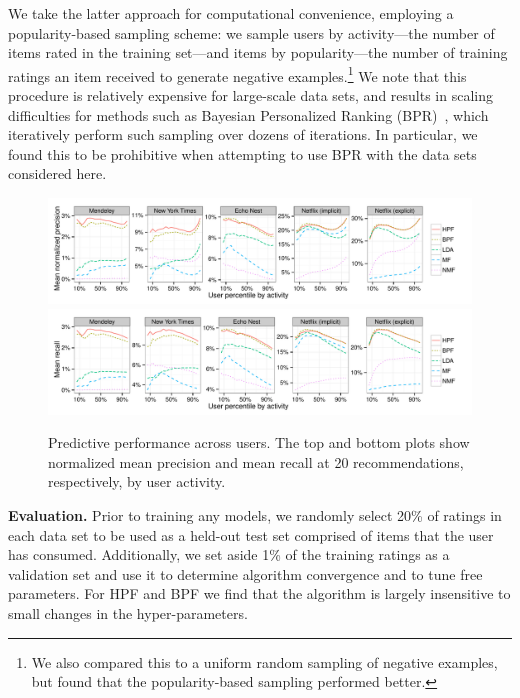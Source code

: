 We take the latter approach for computational convenience, employing a
popularity-based sampling scheme: we sample users by activity---the
number of items rated in the training set---and items by
popularity---the number of training ratings an item received to
generate negative examples.\footnote{We also compared this to a
  uniform random sampling of negative examples, but found that the
  popularity-based sampling performed better.} We note that this
procedure is relatively expensive for large-scale data sets, and
results in scaling difficulties for methods such as Bayesian
Personalized Ranking (BPR)~\cite{Rendle:2009p9243,Gantner:2012p9364},
which iteratively perform such sampling over dozens of iterations. In
particular, we found this to be prohibitive when attempting to use BPR
with the data sets considered here.


\begin{figure}[t!]
\centering
\includegraphics[width=\textwidth]{figures/mean_precision_at_20_by_user_percentile.pdf}\\
\includegraphics[width=\textwidth]{figures/mean_recall_at_20_by_user_percentile.pdf}\\
\caption{Predictive performance across users. The top and bottom plots
  show normalized mean precision and mean recall at 20
  recommendations, respectively, by user activity.}
\label{fig:precision_recall_by_user_activity}
\end{figure}

{\bf Evaluation.} Prior to training any models, we randomly select
20\% of ratings in each data set to be used as a held-out test set
comprised of items that the user has consumed. Additionally, we set
aside 1\% of the training ratings as a validation set and use it to
determine algorithm convergence and to tune free parameters. For HPF
and BPF we find that the algorithm is largely insensitive to small
changes in the hyper-parameters.

